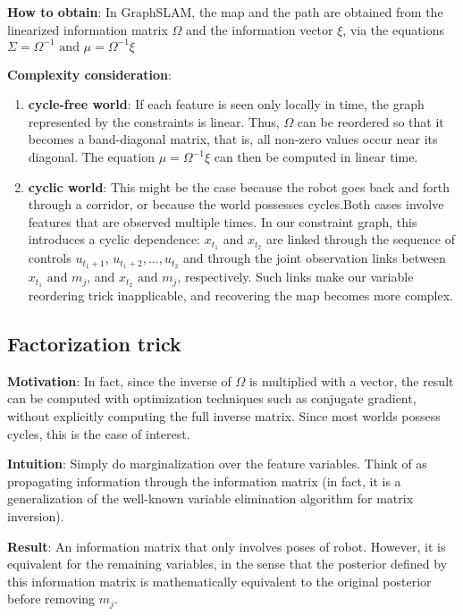 \textbf{How to obtain}: In GraphSLAM, the map and the path are obtained from the linearized information matrix $\Omega$ and the information vector $\xi$, via the equations $\Sigma = \Omega^{-1} \text{ and } \mu = \Omega^{-1}\xi$

\textbf{Complexity consideration}: 
\begin{enumerate}
    \item \textbf{cycle-free world}: If each feature is seen only locally in time, the graph represented by the constraints is linear. Thus, $\Omega$ can be reordered so that it becomes a band-diagonal matrix, that is, all non-zero values occur near its diagonal. The equation $\mu = \Omega^{-1} \xi$ can then be computed in linear time.
    \item \textbf{cyclic world}: This might be the case because the robot goes back and forth through a corridor, or because the world possesses cycles.Both cases involve features that are observed multiple times. In our constraint graph, this introduces a cyclic dependence: $x_{t_1}$ and $x_{t_2}$ are linked through the sequence of controls $u_{{t_1}+1}$, $u_{{t_1}+2}, \dots, u_{t_2}$ and through the joint observation links between $x_{t_1} \text{ and } m_j$, and $x_{t_2} \text{ and } m_j$, respectively. Such links make our variable reordering trick inapplicable, and recovering the map becomes more complex. 
\end{enumerate}

\subsection{Factorization trick}
\textbf{Motivation}: In fact, since the inverse of $\Omega$ is multiplied with a vector, the result can be computed with optimization techniques such as conjugate gradient, without explicitly computing the full inverse matrix. Since most worlds possess cycles, this is the case of interest. 

\textbf{Intuition}: Simply do marginalization over the feature variables. Think of as propagating information through the information matrix (in fact, it is a generalization of the well-known variable elimination algorithm for matrix inversion). 

\textbf{Result}: An information matrix that only involves poses of robot. However, it is equivalent for the remaining variables, in the sense that the posterior defined by this information matrix is mathematically equivalent to the original posterior before removing $m_j$.